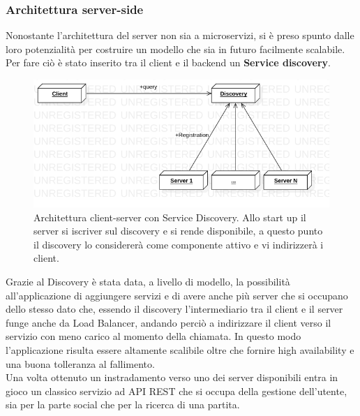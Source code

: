         
            \subsubsection{Architettura server-side}\label{subsub:architecture:server}
            Nonostante l'architettura del server non sia a microservizi, si è preso spunto dalle loro potenzialità per costruire un modello che sia in futuro facilmente scalabile. 
            \\
            Per fare ciò è stato inserito tra il client e il backend un \textbf{Service discovery}. 
            
            \begin{figure}[h!]
                \includegraphics[width=\linewidth]{image/ArchitetturaDiscovery.png}
                \caption{Architettura client-server con Service Discovery. Allo start up il server si iscriver sul discovery e si rende disponibile, a questo punto il discovery lo considererà come componente attivo e vi indirizzerà i client.}
            \end{figure}

            Grazie al Discovery è stata data, a livello di modello, la possibilità all'applicazione di aggiungere servizi e di avere anche più server che si occupano dello stesso dato che, essendo il discovery l'intermediario tra il client e il server funge anche da Load Balancer, andando perciò a indirizzare il client verso il servizio con meno carico al momento della chiamata.
            In questo modo l'applicazione risulta essere altamente scalibile oltre che fornire high availability e una buona tolleranza al fallimento. 
            \\
            Una volta ottenuto un instradamento verso uno dei server disponibili entra in gioco un classico servizio ad API REST che si occupa della gestione dell'utente, sia per la parte social che per la ricerca di una partita. 
            
